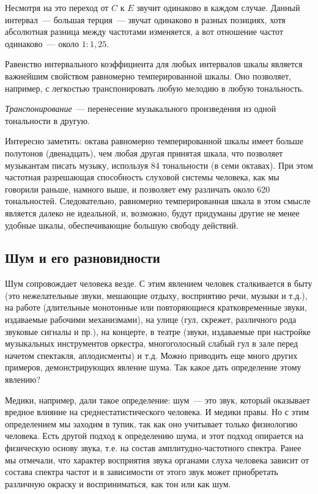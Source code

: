 \documentclass[oneside, final, 14pt]{extreport}
\begin{document}
Несмотря на это переход от $C$ к $E$ звучит одинаково в каждом случае. Данный интервал~--- большая терция~--- звучат одинаково в разных позициях, хотя абсолютная разница между частотами изменяется, а вот отношение частот одинаково~--- около $1:1,25$.

Равенство интервального коэффициента для любых интервалов шкалы является важнейшим свойством равномерно темперированной шкалы. Оно позволяет, например, с легкостью транспонировать любую мелодию в любую тональность.

{\itshape Транспонирование}~--- перенесение музыкального произведения из одной тональности в другую.

Интересно заметить: октава равномерно темперированной шкалы имеет больше полутонов (двенадцать), чем любая другая принятая шкала, что позволяет музыкантам писать музыку, используя 84 тональности (в семи октавах). При этом частотная разрешающая способность слуховой системы человека, как мы говорили раньше, намного выше, и позволяет ему различать около 620 тональностей. Следовательно, равномерно темперированная шкала в этом смысле является далеко не идеальной, и, возможно, будут придуманы другие не менее удобные шкалы, обеспечивающие большую свободу действий.

\subsection{Шум и его разновидности}
Шум сопровождает человека везде. С этим явлением человек сталкивается в быту (это нежелательные звуки, мешающие отдыху, восприятию речи, музыки и т.д.), на работе (длительные монотонные или повторяющиеся кратковременные звуки, издаваемые рабочими механизмами), на улице (гул, скрежет, различного рода звуковые сигналы и пр.), на концерте, в театре (звуки, издаваемые при настройке музыкальных инструментов оркестра, многоголосный слабый гул в зале перед начетом спектакля, аплодисменты) и т.д. Можно приводить еще много других примеров, демонстрирующих явление шума. Так какое дать определение этому явлению? 

Медики, например, дали такое определение: шум~--- это звук, который оказывает вредное влияние на среднестатистического человека. И медики правы. Но с этим определением мы заходим в тупик, так как оно учитывает только физиологию человека. Есть другой подход к определению шума, и этот подход опирается на физическую основу звука, т.е. на состав амплитудно-частотного спектра. Ранее мы отмечали, что характер восприятия звука органами слуха человека зависит от состава спектра частот и в зависимости от этого звук может приобретать различную окраску и восприниматься, как тон или как шум. 
\end{document}
